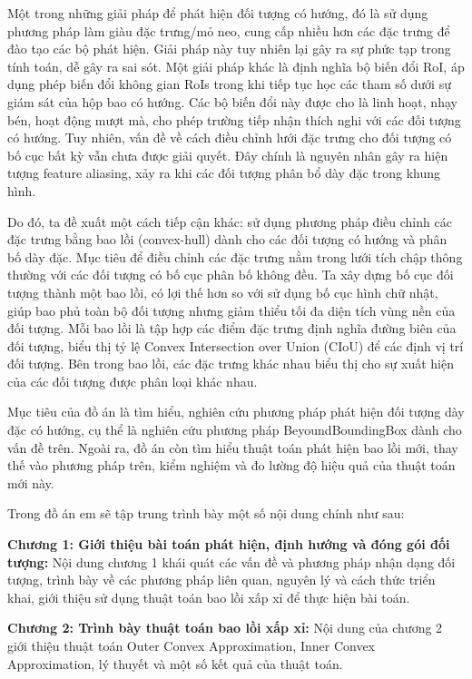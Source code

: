 \documentclass[12pt,a4paper,openany,oneside]{report}
\begin{document}
Một trong những giải pháp để phát hiện đối tượng có hướng, đó là sử dụng phương pháp làm giàu đặc trưng/mỏ neo, cung cấp nhiều hơn các đặc trưng để đào tạo các bộ phát hiện. Giải pháp này tuy nhiên lại gây ra sự phức tạp trong tính toán, dễ gây ra sai sót. Một giải pháp khác là định nghĩa bộ biến đổi RoI, áp dụng phép biến đổi không gian RoIs trong khi tiếp tục học các tham số dưới sự giám sát của hộp bao có hướng. Các bộ biến đổi này được cho là linh hoạt, nhạy bén, hoạt động mượt mà, cho phép trường tiếp nhận thích nghi với các đối tượng có hướng. Tuy nhiên, vấn đề về cách điều chỉnh lưới đặc trưng cho đối tượng có bố cục bất kỳ vẫn chưa được giải quyết. Đây chính là nguyên nhân gây ra hiện tượng feature aliasing, xảy ra khi các đối tượng phân bổ dày đặc trong khung hình.


Do đó, ta đề xuất một cách tiếp cận khác: sử dụng phương pháp điều chỉnh các đặc trưng bằng bao lồi (convex-hull) dành cho các đối tượng có hướng và phân bố dày đặc. Mục tiêu để điều chỉnh các đặc trưng nằm trong lưới tích chập thông thường với các đối tượng có bố cục phân bố không đều. Ta xây dựng bố cục đối tượng thành một bao lồi, có lợi thế hơn so với sử dụng bố cục hình chữ nhật, giúp bao phủ toàn bộ đối tượng nhưng giảm thiểu tối đa diện tích vùng nền của đối tượng. Mỗi bao lồi là tập hợp các điểm đặc trưng định nghĩa đường biên của đối tượng, biểu thị tỷ lệ Convex Intersection over Union (CIoU) để các định vị trí đối tượng. Bên trong bao lồi, các đặc trưng khác nhau biểu thị cho sự xuất hiện của các đối tượng được phân loại khác nhau.


Mục tiêu của đồ án là tìm hiểu, nghiên cứu phương pháp phát hiện đối tượng dày đặc có hướng, cụ thể là nghiên cứu phương pháp BeyoundBoundingBox dành cho vấn đề trên. Ngoài ra, đồ án còn tìm hiểu thuật toán phát hiện bao lồi mới, thay thế vào phương pháp trên, kiểm nghiệm và đo lường độ hiệu quả của thuật toán mới này.


Trong đồ án em sẽ tập trung trình bày một số nội dung chính như sau:

\textbf{Chương 1: Giới thiệu bài toán phát hiện, định hướng và đóng gói đối tượng:}
Nội dung chương 1 khái quát các vấn đề và phương pháp nhận dạng đối tượng, trình bày về các phương pháp liên quan, nguyên lý và cách thức triển khai, giới thiệu sử dụng thuật toán bao lồi xấp xỉ để thực hiện bài toán.


\textbf{Chương 2: Trình bày thuật toán bao lồi xấp xỉ:}
Nội dung của chương 2 giới thiệu thuật toán Outer Convex Approximation, Inner Convex Approximation, lý thuyết và một số kết quả của thuật toán.
\end{document}
